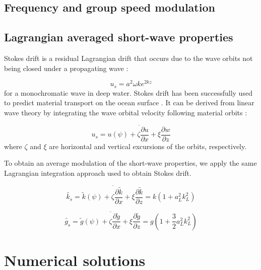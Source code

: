 \documentclass[draft]{agujournal2019}
\begin{document}
\subsection{Frequency and group speed modulation}

\subsection{Lagrangian averaged short-wave properties}

Stokes drift is a residual Lagrangian drift that occurs due to the wave orbits
not being closed under a propagating wave
\cite{stokes1847,kenyon1969stokes,van2018stokes}:

\begin{equation}
\label{}
u_s = a^2 \omega k e^{2kz}
\end{equation}
for a monochromatic wave in deep water.
Stokes drift has been successfully used to predict material transport on the
ocean surface \cite{rohrs2012observation,curcic2016hurricane}.
It can be derived from linear wave theory by integrating the wave orbital
velocity following material orbits \cite{phillips1966dynamics}:

\begin{equation}
\label{eq:lagrangian_average}
u_s = \overline{
  u(\psi) + 
  \zeta \dfrac{\partial u}{\partial x} +
  \xi \dfrac{\partial w}{\partial z}
}
\end{equation}
where $\zeta$ and $\xi$ are horizontal and vertical excursions of the orbits,
respectively.

To obtain an average modulation of the short-wave properties, we apply the same
Lagrangian integration approach used to obtain Stokes drift.

\begin{equation}
\label{eq:stokes_wavenumber}
\widetilde{k_s} = \overline{
  \widetilde{k}(\psi) +
  \zeta \dfrac{\partial \widetilde{k}}{\partial x} +
  \xi \dfrac{\partial \widetilde{k}}{\partial z}
}
= k \left( 1 + a_L^2 k_L^2 \right)
\end{equation}

\begin{equation}
\label{eq:stokes_gravity}
\widetilde{g_s} = \overline{
  \widetilde{g}(\psi) +
  \zeta \dfrac{\partial \widetilde{g}}{\partial x} +
  \xi \dfrac{\partial \widetilde{g}}{\partial z}
}
= g \left( 1 + \dfrac{3}{2} a_L^2 k_L^2 \right)
\end{equation}

\section{Numerical solutions}
\label{section:numerical_solutions}
\end{document}
